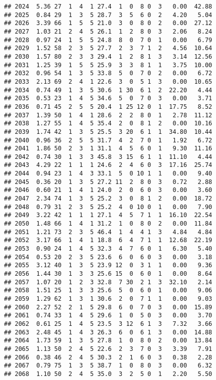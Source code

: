 \documentclass[
]{article}
\begin{document}
\begin{verbatim}
## 2024  5.36 27  1  4  1 27.4  1  0  8 0  3   0.00  42.88
## 2025  0.84 29  1  3  5 28.7  3  5  6 0  2   4.20   5.04
## 2026  3.39 66  1  5  5 21.0  3  0  8 0  2   0.00  27.12
## 2027  1.03 21  2  4  5 26.1  1  2  8 0  3   2.06   8.24
## 2028  0.97 24  1  5  5 24.8  8  0  7 0  1   0.00   6.79
## 2029  1.52 58  2  3  5 27.7  2  3  7 1  2   4.56  10.64
## 2030  1.57 80  2  3  3 29.4  1  2  8 1  3   3.14  12.56
## 2031  1.25 39  1  5  5 25.9  3  3  8 1  1   3.75  10.00
## 2032  0.96 54  1  3  5 33.8  5  0  7 0  2   0.00   6.72
## 2033  2.13 69  2  4  1 22.6  3  0  5 1  3   0.00  10.65
## 2034  0.74 49  1  3  5 30.6  1 30  6 1  2  22.20   4.44
## 2035  0.53 23  1  4  5 34.6  5  0  7 0  3   0.00   3.71
## 2036  0.71 45  2  5  5 20.4  1 25 12 0  1  17.75   8.52
## 2037  1.39 50  1  4  1 28.6  2  2  8 0  1   2.78  11.12
## 2038  1.27 55  1  4  5 35.4  2  0  8 1  2   0.00  10.16
## 2039  1.74 42  1  3  5 25.5  3 20  6 1  1  34.80  10.44
## 2040  0.96 36  2  5  5 31.7  4  2  7 0  1   1.92   6.72
## 2041  1.86 50  2  3  1 31.1  4  5  6 0  1   9.30  11.16
## 2042  0.74 30  1  3  3 45.8  3 15  6 1  1  11.10   4.44
## 2043  4.29 22  1  1  1 24.6  2  4  6 0  3  17.16  25.74
## 2044  0.94 23  1  4  3 33.1  5  0 10 1  1   0.00   9.40
## 2045  0.36 20  1  3  5 27.2 11  2  8 0  3   0.72   2.88
## 2046  0.60 21  1  4  1 24.0  2  0  6 0  3   0.00   3.60
## 2047  2.34 74  1  3  5 25.2  3  0  8 1  2   0.00  18.72
## 2048  0.79 31  2  3  5 25.2  4  0 10 0  1   0.00   7.90
## 2049  3.22 42  1  1  1 27.1  4  5  7 1  1  16.10  22.54
## 2050  1.48 66  1  4  1 31.2  1  0  8 0  2   0.00  11.84
## 2051  1.21 73  2  3  5 46.4  1  4  4 1  3   4.84   4.84
## 2052  3.17 66  1  4  1 18.8  6  4  7 1  1  12.68  22.19
## 2053  0.90 24  1  4  5 32.3  4  7  6 0  1   6.30   5.40
## 2054  0.53 20  2  3  5 23.6  6  0  6 0  3   0.00   3.18
## 2055  3.12 40  1  3  5 23.9 12  0  3 1  1   0.00   9.36
## 2056  1.44 30  1  3  3 25.6 15  0  6 0  1   0.00   8.64
## 2057  1.07 20  1  2  3 32.8  7 30  2 1  3  32.10   2.14
## 2058  1.51 25  1  3  3 25.6  5  0  6 0  1   0.00   9.06
## 2059  1.29 62  1  3  1 30.6  2  0  7 1  1   0.00   9.03
## 2060  2.27 52  2  1  5 29.8  6  0  7 0  3   0.00  15.89
## 2061  0.74 33  1  4  5 29.6  1  0  5 0  3   0.00   3.70
## 2062  0.61 25  1  4  5 23.5  3 12  6 1  3   7.32   3.66
## 2063  2.48 45  1  4  3 26.3  6  0  6 1  3   0.00  14.88
## 2064  1.73 59  1  3  5 27.8  1  0  8 0  2   0.00  13.84
## 2065  1.13 50  2  4  5 22.6  2  3  7 0  3   3.39   7.91
## 2066  0.38 46  2  4  5 30.3  2  1  6 0  3   0.38   2.28
## 2067  0.79 75  1  3  5 38.7  1  0  8 0  3   0.00   6.32
## 2068  1.10 50  2  4  5 35.0  3  2  5 0  1   2.20   5.50

\end{verbatim}
\end{document}
